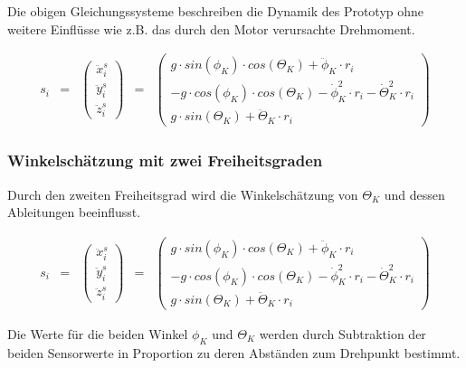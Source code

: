 \documentclass{article}
\begin{document}
Die obigen Gleichungssysteme beschreiben die Dynamik des Prototyp ohne weitere Einflüsse wie z.B. das durch den Motor verursachte Drehmoment.

\begin{equation}
\begin{array}{lclcl}
s_i 
& = & 
\begin{pmatrix} \ddot{x}^s_i \\ \ddot{y}^s_i \\ \ddot{z}^s_i \end{pmatrix}
& = &
\begin{pmatrix} 
g \cdot sin(\phi_K) \cdot cos(\Theta_K) + \ddot{\phi}_K \cdot r_i \\
-g \cdot cos(\phi_K) \cdot cos(\Theta_K) - \dot{\phi}^2_K \cdot r_i - \dot{\Theta}^2_K \cdot r_i \\
g \cdot sin(\Theta_K) + \ddot{\Theta}_K \cdot r_i
\end{pmatrix}
\end{array}
\end{equation}

\subsubsection{Winkelschätzung mit zwei Freiheitsgraden}
Durch den zweiten Freiheitsgrad wird die Winkelschätzung von $\Theta_K$ und dessen Ableitungen beeinflusst. 

\begin{equation}
\begin{array}{lclcl}
s_i 
& = & 
\begin{pmatrix} \ddot{x}^s_i \\ \ddot{y}^s_i \\ \ddot{z}^s_i \end{pmatrix}
& = &
\begin{pmatrix} 
g \cdot sin(\phi_K) \cdot cos(\Theta_K) + \ddot{\phi}_K \cdot r_i \\
-g \cdot cos(\phi_K) \cdot cos(\Theta_K) - \dot{\phi}^2_K \cdot r_i - \dot{\Theta}^2_K \cdot r_i \\
g \cdot sin(\Theta_K) + \ddot{\Theta}_K \cdot r_i
\end{pmatrix}
\end{array}
\end{equation}

Die Werte für die beiden Winkel $\phi_K$ und $\Theta_K$ werden durch Subtraktion der beiden Sensorwerte in Proportion zu deren Abständen zum Drehpunkt bestimmt.
\end{document}
